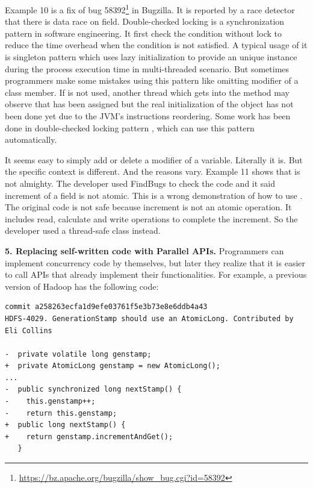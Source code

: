 
Example 10 is a fix of bug 58392\footnote{\url{https://bz.apache.org/bugzilla/show_bug.cgi?id=58392}} in Bugzilla. It is reported by a race detector that there is data race on field. Double-checked locking is a synchronization pattern in software engineering. It first check the condition without lock to reduce the time overhead when the condition is not satisfied. A typical usage of it is singleton pattern which uses lazy initialization to provide an unique instance during the process execution time in multi-threaded scenario. But sometimes programmers make some mistakes using this pattern like omitting  modifier of a class member. If  is not used, another thread which gets into the method may observe that  has been assigned but the real initialization of the object has not been done yet due to the JVM's instructions reordering. Some work has been done in double-checked locking pattern \cite{conf/ispass/IshizakiDN14}, which can use this pattern automatically.



It seems easy to simply add or delete a  modifier of a variable. Literally it is. But the specific context is different. And the reasons vary. Example 11 shows that  is not almighty. The developer used FindBugs to check the code and it said increment of a  field is not atomic. This is a wrong demonstration of how to use . The original code is not safe because increment is not an atomic operation. It includes read, calculate and write operations to complete the increment. So the developer used a thread-safe class instead.

\noindent
\textbf{5. Replacing self-written code with Parallel APIs.} Programmers can implement concurrency code by themselves, but later they realize that it is easier to call APIs that already implement their functionalities. For example, a previous version of Hadoop has the following code:%

\begin{lstlisting}
commit a258263ecfa1d9efe03761f5e3b73e8e6ddb4a43
HDFS-4029. GenerationStamp should use an AtomicLong. Contributed by Eli Collins

-  private volatile long genstamp;
+  private AtomicLong genstamp = new AtomicLong();
...
-  public synchronized long nextStamp() {
-    this.genstamp++;
-    return this.genstamp;
+  public long nextStamp() {
+    return genstamp.incrementAndGet();
   }
\end{lstlisting}

